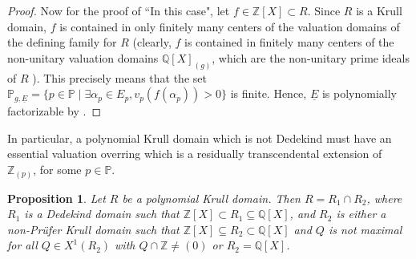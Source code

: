 \documentclass[10pt]{article}
\numberwithin{equation}{section}
\newtheorem{Prop}[equation]{Proposition}
\theoremstyle{definition}
\theoremstyle{definition}
\newcommand{\Q}{\mathbb{Q}}
\newcommand{\Z}{\mathbb{Z}}
\newcommand{\PP}{\mathbb{P}}
\newcommand{\uE}{\underline{E}}
\newcommand{\rt}{\text{rt}}
\newcommand\rc { \color{red}}
\begin{document}
\begin{proof}
Now for the proof of ``In this case", let $f\in\Z[X]\subset R$.  Since $R$ is a Krull domain, $f$ is contained in only finitely many centers of the valuation domains of the defining family for $R$ (clearly,  $f$ is contained in finitely many centers of the non-unitary valuation domains $\Q[X]_{(g)}$, which are the non-unitary prime ideals of $R$ ). This precisely means that the set $\PP_{g,\uE}=\{p\in\PP\mid \exists\alpha_p\in E_p, v_p(f(\alpha_p))>0\}$ is finite.  Hence, $\uE$ is polynomially factorizable by  \cite[Lemma 2.12]{PerDedekind}.
\end{proof}

In particular, a polynomial Krull domain which is not Dedekind must have an essential valuation
overring which is a residually transcendental extension of $\Z_{(p)}$, for some $p\in\PP$.


\begin{Prop}\label{Krull intersection}
Let $R$ be a polynomial Krull domain. Then
$R=R_1\cap R_2$, where $R_1  $ is a Dedekind domain such that $\Z[X]\subset R_1\subseteq\Q[X]$, and $R_2$ is either
a non-Pr\"ufer Krull domain such that $\Z[X]\subseteq R_2\subset\Q[X]$ 
and $Q$ is not maximal for all $Q \in X^1(R_2)$ with $Q \cap \Z \neq (0)$ 
or $R_2=\Q[X]$.
\end{Prop}
\end{document}
